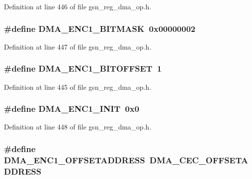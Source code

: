Definition at line 446 of file gsn\_\-reg\_\-dma\_\-op.h.

\hypertarget{a00547_a03035720981ee88338fb36db0dc5fc4d}{
\subsubsection[{DMA\_\-ENC1\_\-BITMASK}]{\setlength{\rightskip}{0pt plus 5cm}\#define DMA\_\-ENC1\_\-BITMASK~0x00000002}}
\label{a00547_a03035720981ee88338fb36db0dc5fc4d}


Definition at line 447 of file gsn\_\-reg\_\-dma\_\-op.h.

\hypertarget{a00547_a5665d25f0b0a7d87974aa69374eae06c}{
\subsubsection[{DMA\_\-ENC1\_\-BITOFFSET}]{\setlength{\rightskip}{0pt plus 5cm}\#define DMA\_\-ENC1\_\-BITOFFSET~1}}
\label{a00547_a5665d25f0b0a7d87974aa69374eae06c}


Definition at line 445 of file gsn\_\-reg\_\-dma\_\-op.h.

\hypertarget{a00547_a77329e16de9737f86123818e56a538f8}{
\subsubsection[{DMA\_\-ENC1\_\-INIT}]{\setlength{\rightskip}{0pt plus 5cm}\#define DMA\_\-ENC1\_\-INIT~0x0}}
\label{a00547_a77329e16de9737f86123818e56a538f8}


Definition at line 448 of file gsn\_\-reg\_\-dma\_\-op.h.

\hypertarget{a00547_a9e62a6f40a6bd7a4c2d220a3e979bf61}{
\subsubsection[{DMA\_\-ENC1\_\-OFFSETADDRESS}]{\setlength{\rightskip}{0pt plus 5cm}\#define DMA\_\-ENC1\_\-OFFSETADDRESS~DMA\_\-CEC\_\-OFFSETADDRESS}}
\label{a00547_a9e62a6f40a6bd7a4c2d220a3e979bf61}


